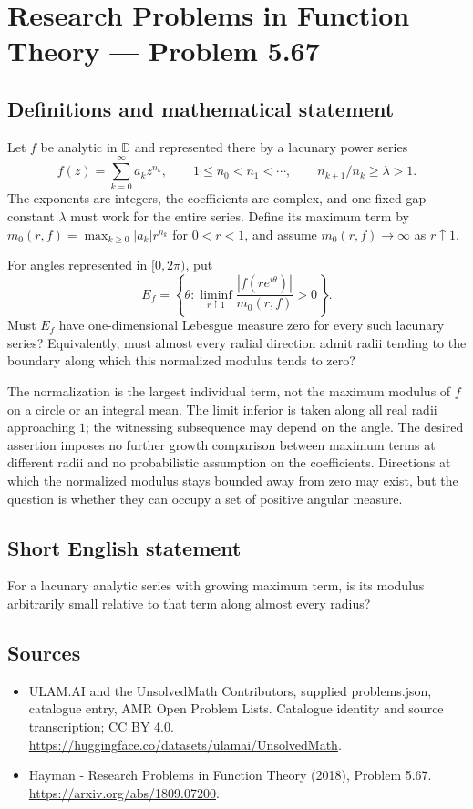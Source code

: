 \documentclass[11pt,a4paper]{article}
\begin{document}
\section*{Research Problems in Function Theory — Problem 5.67}\label{statement}

\subsection{Definitions and mathematical statement}
Let $f$ be analytic in $\mathbb D$ and represented there by a
lacunary power series
\[
 f(z)=\sum_{k=0}^{\infty}a_kz^{n_k},\qquad
 1\leq n_0<n_1<\cdots,\qquad n_{k+1}/n_k\geq\lambda>1.
\]
The exponents are integers, the coefficients are complex, and
one fixed gap constant $\lambda$ must work for the entire
series. Define its maximum term by
$m_0(r,f)=\max_{k\geq0}|a_k|r^{n_k}$ for $0<r<1$,
and assume $m_0(r,f)\to\infty$ as $r\uparrow1$.

For angles represented in $[0,2\pi)$, put
\[
 E_f=\left\{\theta:
       \liminf_{r\uparrow1}
       \frac{|f(re^{i\theta})|}{m_0(r,f)}>0\right\}.
\]
Must $E_f$ have one-dimensional Lebesgue measure zero for
every such lacunary series? Equivalently, must almost every
radial direction admit radii tending to the boundary along
which this normalized modulus tends to zero?

The normalization is the largest individual term, not the
maximum modulus of $f$ on a circle or an integral mean.
The limit inferior is taken along all real radii approaching
$1$; the witnessing subsequence may depend on the angle.
The desired assertion imposes no further growth comparison
between maximum terms at different radii and no probabilistic
assumption on the coefficients. Directions at which the
normalized modulus stays bounded away from zero may exist,
but the question is whether they can occupy a set of
positive angular measure.
\subsection{Short English statement}
For a lacunary analytic series with growing maximum term, is its modulus arbitrarily small relative to that term along almost every radius?
\subsection{Sources}
\begin{itemize}
\item[S1] ULAM.AI and the UnsolvedMath Contributors, supplied problems.json, catalogue entry, AMR Open Problem Lists. Catalogue identity and source transcription; CC BY 4.0.
\url{https://huggingface.co/datasets/ulamai/UnsolvedMath}.
\item[S2] Hayman - Research Problems in Function Theory (2018), Problem 5.67. 
\url{https://arxiv.org/abs/1809.07200}.
\end{itemize}
\end{document}

